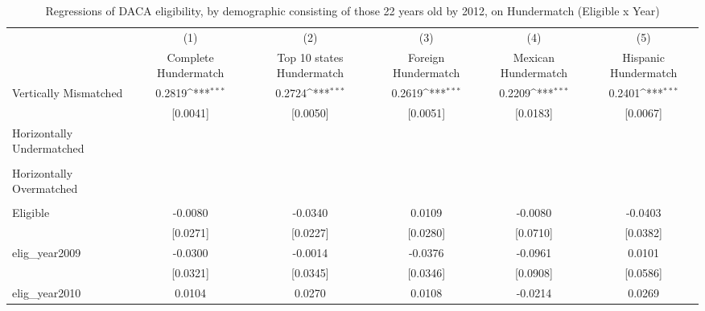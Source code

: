 \begin{table}[htbp]\centering
\def\sym#1{\ifmmode^{#1}\else\(^{#1}\)\fi}
\caption{Regressions of DACA eligibility, by demographic consisting of those 22 years old by 2012, on Hundermatch (Eligible x Year)}
\begin{tabular}{l*{5}{c}}
\toprule
                    &\multicolumn{1}{c}{(1)}         &\multicolumn{1}{c}{(2)}         &\multicolumn{1}{c}{(3)}         &\multicolumn{1}{c}{(4)}         &\multicolumn{1}{c}{(5)}         \\
                    &Complete Hundermatch         &Top 10 states Hundermatch         &Foreign Hundermatch         &Mexican Hundermatch         &Hispanic Hundermatch         \\
\midrule
Vertically Mismatched&      0.2819\sym{***}&      0.2724\sym{***}&      0.2619\sym{***}&      0.2209\sym{***}&      0.2401\sym{***}\\
                    &    [0.0041]         &    [0.0050]         &    [0.0051]         &    [0.0183]         &    [0.0067]         \\
\addlinespace
Horizontally Undermatched&                     &                     &                     &                     &                     \\
                    &                     &                     &                     &                     &                     \\
\addlinespace
Horizontally Overmatched&                     &                     &                     &                     &                     \\
                    &                     &                     &                     &                     &                     \\
\addlinespace
Eligible            &     -0.0080         &     -0.0340         &      0.0109         &     -0.0080         &     -0.0403         \\
                    &    [0.0271]         &    [0.0227]         &    [0.0280]         &    [0.0710]         &    [0.0382]         \\
\addlinespace
elig\_year2009       &     -0.0300         &     -0.0014         &     -0.0376         &     -0.0961         &      0.0101         \\
                    &    [0.0321]         &    [0.0345]         &    [0.0346]         &    [0.0908]         &    [0.0586]         \\
\addlinespace
elig\_year2010       &      0.0104         &      0.0270         &      0.0108         &     -0.0214         &      0.0269         \\

\end{tabular}
\end{table}

